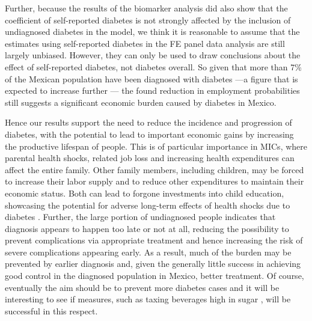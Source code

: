 \documentclass[12pt,english]{article}
\begin{document}
Further, because the results of the biomarker analysis did also show that the coefficient of self-reported diabetes is not strongly affected by the inclusion of undiagnosed diabetes in the model, we think it is reasonable to assume that the estimates using self-reported diabetes in the \ac{FE} panel data analysis are still largely unbiased. However, they can only be used to draw conclusions about the effect of self-reported diabetes, not diabetes overall. So given that more than 7\% of the Mexican population have been diagnosed with diabetes ---a figure that is expected to increase further \parencite{Meza2015}--- the found reduction in employment probabilities still suggests a significant economic burden caused by diabetes in Mexico. 

Hence our results support the need to reduce the incidence and progression of diabetes, with the potential to lead to important economic gains by increasing the productive lifespan of people. This is of particular importance in \ac{MICs}, where parental health shocks, related job loss and increasing health expenditures can affect the entire family. Other family members, including children, may be forced to increase their labor supply and to reduce other expenditures to maintain their economic status. Both can lead to forgone investments into child education, showcasing the potential for adverse long-term effects of health shocks due to diabetes \parencite{Bratti2014}. Further, the large portion of undiagnosed people indicates that diagnosis appears to happen too late or not at all, reducing the possibility to prevent complications via appropriate treatment and hence increasing the risk of severe complications appearing early. As a result, much of the burden may be prevented by earlier diagnosis and, given the generally little success in achieving good control in the diagnosed population in Mexico, better treatment. Of course, eventually the aim should be to prevent more diabetes cases and it will be interesting to see if measures, such as taxing beverages high in sugar \parencite{}, will be successful in this respect.
\end{document}
